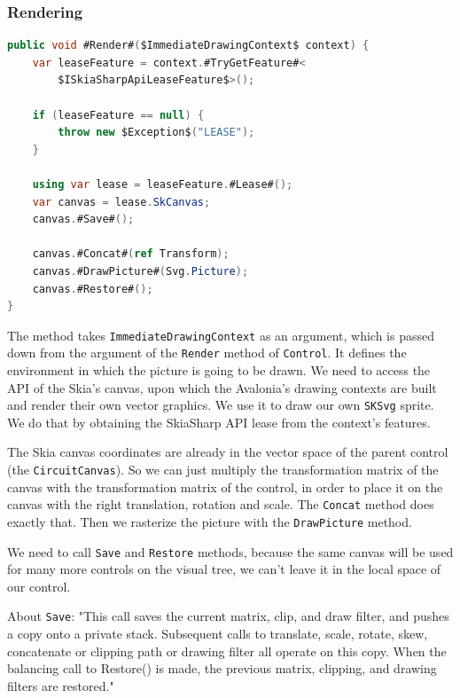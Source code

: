 \subsubsection{Rendering}

\begin{lstlisting}[language=csharp, caption={\texttt{SvgDrawOp.Render} method}]
public void #Render#($ImmediateDrawingContext$ context) {
    var leaseFeature = context.#TryGetFeature#<
        $ISkiaSharpApiLeaseFeature$>();

    if (leaseFeature == null) {
        throw new $Exception$("LEASE");
    }

    using var lease = leaseFeature.#Lease#();
    var canvas = lease.SkCanvas;
    canvas.#Save#();

    canvas.#Concat#(ref Transform);
    canvas.#DrawPicture#(Svg.Picture);
    canvas.#Restore#();
}
\end{lstlisting}

The method takes \texttt{ImmediateDrawingContext} as an argument, which is passed down from the argument of the \texttt{Render} method of \texttt{Control}. It defines the environment in which the picture is going to be drawn. We need to access the API of the Skia's canvas, upon which the Avalonia's drawing contexts are built and render their own vector graphics. We use it to draw our own \texttt{SKSvg} sprite. We do that by obtaining the SkiaSharp API lease from the context's features. \footnotemark

The Skia canvas coordinates are already in the vector space of the parent control (the \texttt{CircuitCanvas}). So we can just multiply the transformation matrix of the canvas with the transformation matrix of the control, in order to place it on the canvas with the right translation, rotation and scale. The \texttt{Concat} method does exactly that. Then we rasterize the picture with the \texttt{DrawPicture} method.

We need to call \texttt{Save} and \texttt{Restore} methods, because the same canvas will be used for many more controls on the visual tree, we can't leave it in the local space of our control.

About \texttt{Save}: "This call saves the current matrix, clip, and draw filter, and pushes a copy onto a private stack. Subsequent calls to translate, scale, rotate, skew, concatenate or clipping path or drawing filter all operate on this copy. When the balancing call to Restore() is made, the previous matrix, clipping, and drawing filters are restored." \cite{skiasharp_save}

